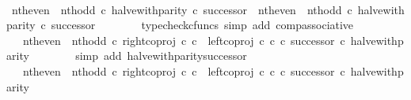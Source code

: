 \begin{isabellebody}
\ \ \ \ \isamarkupfalse%
\ {\isachardoublequoteopen}{\isacharparenleft}{\kern0pt}nth{\isacharunderscore}{\kern0pt}even\ {\isasymamalg}\ nth{\isacharunderscore}{\kern0pt}odd\ {\isasymcirc}\isactrlsub c\ halve{\isacharunderscore}{\kern0pt}with{\isacharunderscore}{\kern0pt}parity{\isacharparenright}{\kern0pt}\ {\isasymcirc}\isactrlsub c\ successor\ {\isacharequal}{\kern0pt}\ nth{\isacharunderscore}{\kern0pt}even\ {\isasymamalg}\ nth{\isacharunderscore}{\kern0pt}odd\ {\isasymcirc}\isactrlsub c\ halve{\isacharunderscore}{\kern0pt}with{\isacharunderscore}{\kern0pt}parity\ {\isasymcirc}\isactrlsub c\ successor{\isachardoublequoteclose}\isanewline
\ \ \ \ \ \ \isamarkupfalse%
\ {\isacharparenleft}{\kern0pt}typecheck{\isacharunderscore}{\kern0pt}cfuncs{\isacharcomma}{\kern0pt}\ simp\ add{\isacharcolon}{\kern0pt}\ comp{\isacharunderscore}{\kern0pt}associative{}{\isacharparenright}{\kern0pt}\isanewline
\ \ \ \ \isamarkupfalse%
\ \isamarkupfalse%
\ {\isachardoublequoteopen}{\isachardot}{\kern0pt}{\isachardot}{\kern0pt}{\isachardot}{\kern0pt}\ {\isacharequal}{\kern0pt}\ nth{\isacharunderscore}{\kern0pt}even\ {\isasymamalg}\ nth{\isacharunderscore}{\kern0pt}odd\ {\isasymcirc}\isactrlsub c\ right{\isacharunderscore}{\kern0pt}coproj\ {\isasymnat}\isactrlsub c\ {\isasymnat}\isactrlsub c\ {\isasymamalg}\ {\isacharparenleft}{\kern0pt}left{\isacharunderscore}{\kern0pt}coproj\ {\isasymnat}\isactrlsub c\ {\isasymnat}\isactrlsub c\ {\isasymcirc}\isactrlsub c\ successor{\isacharparenright}{\kern0pt}\ {\isasymcirc}\isactrlsub c\ halve{\isacharunderscore}{\kern0pt}with{\isacharunderscore}{\kern0pt}parity{\isachardoublequoteclose}\isanewline
\ \ \ \ \ \ \isamarkupfalse%
\ {\isacharparenleft}{\kern0pt}simp\ add{\isacharcolon}{\kern0pt}\ halve{\isacharunderscore}{\kern0pt}with{\isacharunderscore}{\kern0pt}parity{\isacharunderscore}{\kern0pt}successor{\isacharparenright}{\kern0pt}\isanewline
\ \ \ \ \isamarkupfalse%
\ \isamarkupfalse%
\ {\isachardoublequoteopen}{\isachardot}{\kern0pt}{\isachardot}{\kern0pt}{\isachardot}{\kern0pt}\ {\isacharequal}{\kern0pt}\ {\isacharparenleft}{\kern0pt}nth{\isacharunderscore}{\kern0pt}even\ {\isasymamalg}\ nth{\isacharunderscore}{\kern0pt}odd\ {\isasymcirc}\isactrlsub c\ right{\isacharunderscore}{\kern0pt}coproj\ {\isasymnat}\isactrlsub c\ {\isasymnat}\isactrlsub c\ {\isasymamalg}\ {\isacharparenleft}{\kern0pt}left{\isacharunderscore}{\kern0pt}coproj\ {\isasymnat}\isactrlsub c\ {\isasymnat}\isactrlsub c\ {\isasymcirc}\isactrlsub c\ successor{\isacharparenright}{\kern0pt}{\isacharparenright}{\kern0pt}\ {\isasymcirc}\isactrlsub c\ halve{\isacharunderscore}{\kern0pt}with{\isacharunderscore}{\kern0pt}parity{\isachardoublequoteclose}\isanewline

\end{isabellebody}

